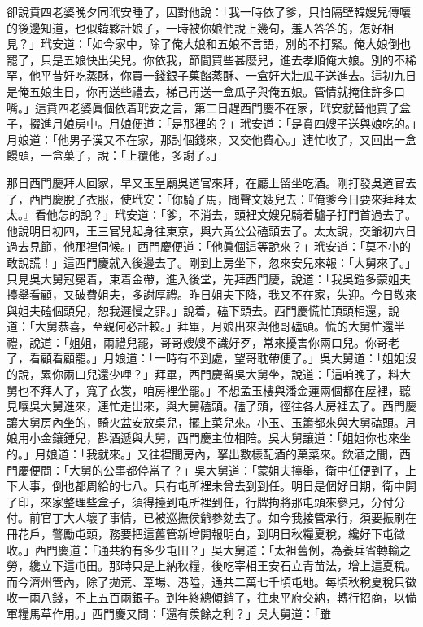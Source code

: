卻說賁四老婆晚夕同玳安睡了，因對他說：「我一時依了爹，只怕隔壁韓嫂兒傳嚷的後邊知道，也似韓夥計娘子，一時被你娘們說上幾句，羞人答答的，怎好相見？」玳安道：「如今家中，除了俺大娘和五娘不言語，別的不打緊。俺大娘倒也罷了，只是五娘快出尖兒。你依我，節間買些甚麼兒，進去孝順俺大娘。別的不稀罕，他平昔好吃蒸酥，你買一錢銀子菓餡蒸酥、一盒好大壯瓜子送進去。這初九日是俺五娘生日，你再送些禮去，梯己再送一盒瓜子與俺五娘。管情就掩住許多口嘴。」{}這賁四老婆眞個依着玳安之言，第二日趕西門慶不在家，玳安就替他買了盒子，掇進月娘房中。月娘便道：「是那裡的？」玳安道：「是賁四嫂子送與娘吃的。」月娘道：「他男子漢又不在家，那討個錢來，又交他費心。」連忙收了，又回出一盒饅頭，一盒菓子，說：「上覆他，多謝了。」

那日西門慶拜人回家，早又玉皇廟吳道官來拜，在廳上留坐吃酒。剛打發吳道官去了，西門慶脫了衣服，使玳安：「你騎了馬，問聲文嫂兒去：『俺爹今日要來拜拜太太。』看他怎的說？」玳安道：「爹，不消去，頭裡文嫂兒騎着驢子打門首過去了。他說明日初四，王三官兒起身往東京，與六黃公公磕頭去了。太太說，交爺初六日過去見節，他那裡伺候。」西門慶便道：「他眞個這等說來？」玳安道：「莫不小的敢說謊！」這西門慶就入後邊去了。剛到上房坐下，忽來安兒來報：「大舅來了。」只見吳大舅冠冕着，束着金帶，進入後堂，先拜西門慶，說道：「我吳鎧多蒙姐夫擡舉看顧，又破費姐夫，多謝厚禮。昨日姐夫下降，我又不在家，失迎。今日敬來與姐夫磕個頭兒，恕我遲慢之罪。」說着，磕下頭去。西門慶慌忙頂頭相還，說道：「大舅恭喜，至親何必計較。」拜畢，月娘出來與他哥磕頭。慌的大舅忙還半禮，說道：「姐姐，兩禮兒罷，哥哥嫂嫂不識好歹，常來擾害你兩口兒。你哥老了，看顧看顧罷。」月娘道：「一時有不到處，望哥耽帶便了。」吳大舅道：「姐姐沒的說，累你兩口兒還少哩？」拜畢，西門慶留吳大舅坐，說道：「這咱晚了，料大舅也不拜人了，寬了衣裳，咱房裡坐罷。」不想孟玉樓與潘金蓮兩個都在屋裡，聽見嚷吳大舅進來，連忙走出來，與大舅磕頭。磕了頭，徑往各人房裡去了。西門慶讓大舅房內坐的，騎火盆安放桌兒，擺上菜兒來。小玉、玉簫都來與大舅磕頭。月娘用小金鑲鍾兒，斟酒遞與大舅，西門慶主位相陪。吳大舅讓道：「姐姐你也來坐的。」月娘道：「我就來。」又往裡間房內，拏出數樣配酒的菓菜來。飲酒之間，西門慶便問：「大舅的公事都停當了？」吳大舅道：「蒙姐夫擡舉，衛中任便到了，上下人事，倒也都周給的七八。只有屯所裡未曾去到到任。明日是個好日期，衛中開了印，來家整理些盒子，須得擡到屯所裡到任，行牌拘將那屯頭來參見，分付分付。前官丁大人壞了事情，已被巡撫侯爺參劾去了。如今我接管承行，須要振刷在冊花戶，警勵屯頭，務要把這舊管新增開報明白，到明日秋糧夏稅，纔好下屯徵收。」西門慶道：「通共約有多少屯田？」吳大舅道：「太祖舊例，為養兵省轉輸之勞，纔立下這屯田。那時只是上納秋糧，後吃宰相王安石立青苗法，增上這夏稅。而今濟州管內，除了拋荒、葦場、港隘，通共二萬七千頃屯地。每頃秋稅夏稅只徵收一兩八錢，不上五百兩銀子。到年終總傾銷了，往東平府交納，轉行招商，以備軍糧馬草作用。」西門慶又問：「還有羨餘之利？」吳大舅道：「雖